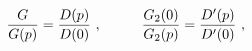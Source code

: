 \begin{equation}\label{b.4}
{G \over G(p)}={D(p) \over D(0)}~,\hskip 1cm
{G_2(0) \over G_2(p)}={D'(p) \over D'(0)}~,
\end{equation}

